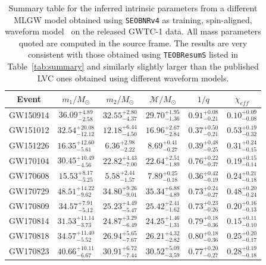 \begin{table}[t]
\centering
\caption{Summary table for the inferred intrinsic parameters from a different MLGW model obtained using  {\tt SEOBNRv4} as training,
spin-aligned, waveform model~\cite{Bohe:2016gbl} on the released GWTC-1 data. All mass parameters quoted are computed in the 
source frame. The results are very consistent with those obtained using {\tt TEOBResumS} listed in Table~\ref{tab:summary} and similarly
slightly larger than the published LVC ones obtained using different waveform models.} 
\label{tab:summary_seob}
\begin{ruledtabular}
\begin{tabular}{cccccc}
Event    & $m_1/M_\odot$ & $m_2/M_\odot$ & $\mathcal{M}/M_\odot$ & $1/q$ & $\chi_{eff}$ \\ \hline
\vspace{1.0 mm}
GW150914& $36.09_{-2.58}^{+4.89}$& $32.55_{-4.37}^{+2.80}$& $29.70_{-1.36}^{+1.95}$& $0.91_{-0.21}^{+0.08}$& $0.10_{-0.08}^{+0.09}$ \\
\vspace{1.0 mm}
GW151012& $32.54_{-12.12}^{+20.08}$& $12.18_{-4.50}^{+6.44}$& $16.96_{-2.84}^{+2.67}$& $0.37_{-0.21}^{+0.50}$& $0.53_{-0.32}^{+0.19}$\\
\vspace{1.0 mm}
GW151226& $16.35_{-5.61}^{+12.60}$& $6.36_{-2.22}^{+2.98}$& $8.69_{-0.27}^{+0.41}$& $0.39_{-0.25}^{+0.48}$& $0.31_{-0.15}^{+0.24}$\\
\vspace{1.0 mm}
GW170104& $30.45_{-4.56}^{+10.49}$& $22.82_{-7.00}^{+4.43}$& $22.64_{-1.89}^{+2.51}$& $0.76_{-0.37}^{+0.22}$& $0.19_{-0.14}^{+0.15}$\\
\vspace{1.0 mm}
GW170608& $15.53_{-5.25}^{+8.17}$& $5.58_{-1.57}^{+2.44}$& $7.89_{-0.18}^{+0.25}$& $0.36_{-0.19}^{+0.42}$& $0.24_{-0.18}^{+0.21}$\\
\vspace{1.0 mm}
GW170729& $48.51_{-9.62}^{+14.22}$& $34.80_{-9.01}^{+9.26}$& $35.34_{-4.89}^{+6.88}$& $0.73_{-0.27}^{+0.24}$& $0.48_{-0.24}^{+0.20}$\\
\vspace{1.0 mm}
GW170809& $34.57_{-5.12}^{+7.91}$& $25.23_{-5.47}^{+4.49}$& $25.42_{-1.62}^{+2.41}$& $0.73_{-0.26}^{+0.23}$& $0.20_{-0.13}^{+0.16}$\\
\vspace{1.0 mm}
GW170814& $31.53_{-3.73}^{+11.14}$& $24.87_{-6.49}^{+3.29}$& $24.25_{-1.31}^{+1.46}$& $0.79_{-0.36}^{+0.18}$& $0.15_{-0.10}^{+0.11}$\\
\vspace{1.0 mm}
GW170818& $34.57_{-5.52}^{+11.40}$& $26.94_{-7.67}^{+5.65}$& $26.21_{-2.82}^{+4.32}$& $0.80_{-0.36}^{+0.18}$& $0.25_{-0.17}^{+0.20}$\\
\vspace{1.0 mm}
GW170823& $40.66_{-6.67}^{+10.11}$& $30.91_{-7.44}^{+6.72}$& $30.52_{-3.59}^{+5.09}$& $0.77_{-0.27}^{+0.20}$& $0.28_{-0.18}^{+0.19}$\\
\end{tabular}
\end{ruledtabular}
\end{table}



